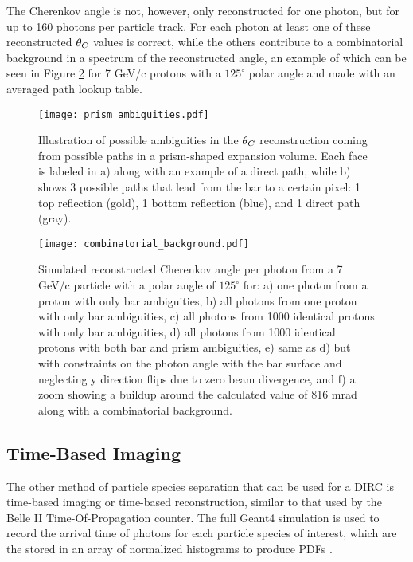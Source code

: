 The Cherenkov angle is not, however, only reconstructed for one photon, but for up to 160 photons per particle track. For each photon at least one of these reconstructed $\theta_{C}$ values is correct, while the others contribute to a combinatorial background in a spectrum of the reconstructed angle, an example of which can be seen in Figure \ref{fig:combinatorial_background} for 7 GeV/c protons with a $125^{\circ}$ polar angle and made with an averaged path lookup table.

\begin{figure}[ht]
	\centering
	\texttt{[image: prism\_ambiguities.pdf]}
	\caption{Illustration of possible ambiguities in the $\theta_{C}$ reconstruction coming from possible paths in a prism-shaped expansion volume. Each face is labeled in a) along with an example of a direct path, while b) shows 3 possible paths that lead from the bar to a certain pixel: 1 top reflection (gold), 1 bottom reflection (blue), and 1 direct path (gray).}
	\label{fig:prism_ambiguities}
\end{figure}

\begin{figure}[ht]
	\centering
	\texttt{[image: combinatorial\_background.pdf]}
	\caption{Simulated reconstructed Cherenkov angle per photon from a 7 GeV/c particle with a polar angle of $125^{\circ}$ for: a) one photon from a proton with only bar ambiguities, b) all photons from one proton with only bar ambiguities, c) all photons from 1000 identical protons with only bar ambiguities, d) all photons from 1000 identical protons with both bar and prism ambiguities, e) same as d) but with constraints on the photon angle with the bar surface and neglecting y direction flips due to zero beam divergence, and f) a zoom showing a buildup around the calculated value of 816 mrad along with a combinatorial background.}
	\label{fig:combinatorial_background}
\end{figure}

\subsection{Time-Based Imaging}
The other method of particle species separation that can be used for a DIRC is time-based imaging or time-based reconstruction, similar to that used by the Belle II Time-Of-Propagation counter. The full Geant4 simulation is used to record the arrival time of photons for each particle species of interest, which are the stored in an array of normalized histograms to produce PDFs \cite{PANDA_barrel}.

